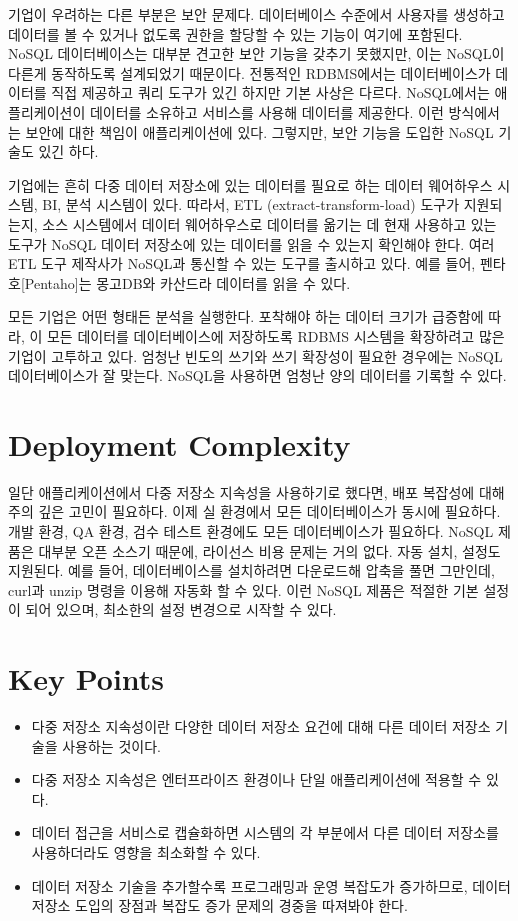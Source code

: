 \documentclass[twocolumn]{article}
\begin{document}
기업이 우려하는 다른 부분은 보안 문제다. 데이터베이스 수준에서 사용자를 생성하고 데이터를 볼 수 있거나 없도록 권한을 할당할 수 있는 기능이 여기에 포함된다. NoSQL 데이터베이스는 대부분 견고한 보안 기능을 갖추기 못했지만, 이는 NoSQL이 다른게 동작하도록 설계되었기 때문이다. 전통적인 RDBMS에서는 데이터베이스가 데이터를 직접 제공하고 쿼리 도구가 있긴 하지만 기본 사상은 다르다. NoSQL에서는 애플리케이션이 데이터를 소유하고 서비스를 사용해 데이터를 제공한다. 이런 방식에서는 보안에 대한 책임이 애플리케이션에 있다. 그렇지만, 보안 기능을 도입한 NoSQL 기술도 있긴 하다.

기업에는 흔히 다중 데이터 저장소에 있는 데이터를 필요로 하는 데이터 웨어하우스 시스템, BI, 분석 시스템이 있다. 따라서, ETL (extract-transform-load) 도구가 지원되는지, 소스 시스템에서 데이터 웨어하우스로 데이터를 옮기는 데 현재 사용하고 있는 도구가 NoSQL 데이터 저장소에 있는 데이터를 읽을 수 있는지 확인해야 한다. 여러 ETL 도구 제작사가 NoSQL과 통신할 수 있는 도구를 출시하고 있다. 예를 들어, 펜타호[Pentaho]는 몽고DB와 카산드라 데이터를 읽을 수 있다.

모든 기업은 어떤 형태든 분석을 실행한다. 포착해야 하는 데이터 크기가 급증함에 따라, 이 모든 데이터를 데이터베이스에 저장하도록 RDBMS 시스템을 확장하려고 많은 기업이 고투하고 있다. 엄청난 빈도의 쓰기와 쓰기 확장성이 필요한 경우에는 NoSQL 데이터베이스가 잘 맞는다. NoSQL을 사용하면 엄청난 양의 데이터를 기록할 수 있다.

\section{Deployment Complexity}
일단 애플리케이션에서 다중 저장소 지속성을 사용하기로 했다면, 배포 복잡성에 대해 주의 깊은 고민이 필요하다. 이제 실 환경에서 모든 데이터베이스가 동시에 필요하다. 개발 환경, QA 환경, 검수 테스트 환경에도 모든 데이터베이스가 필요하다. NoSQL 제품은 대부분 오픈 소스기 때문에, 라이선스 비용 문제는 거의 없다. 자동 설치, 설정도 지원된다. 예를 들어, 데이터베이스를 설치하려면 다운로드해 압축을 풀면 그만인데, curl과 unzip 명령을 이용해 자동화 할 수 있다. 이런 NoSQL 제품은 적절한 기본 설정이 되어 있으며, 최소한의 설정 변경으로 시작할 수 있다.

\section{Key Points}

\begin{itemize}
  \item 다중 저장소 지속성이란 다양한 데이터 저장소 요건에 대해 다른 데이터 저장소 기술을 사용하는 것이다.
  \item 다중 저장소 지속성은 엔터프라이즈 환경이나 단일 애플리케이션에 적용할 수 있다.
  \item 데이터 접근을 서비스로 캡슐화하면 시스템의 각 부분에서 다른 데이터 저장소를 사용하더라도 영향을 최소화할 수 있다.
  \item 데이터 저장소 기술을 추가할수록 프로그래밍과 운영 복잡도가 증가하므로, 데이터 저장소 도입의 장점과 복잡도 증가 문제의 경중을 따져봐야 한다.
\end{itemize}



\end{document}
